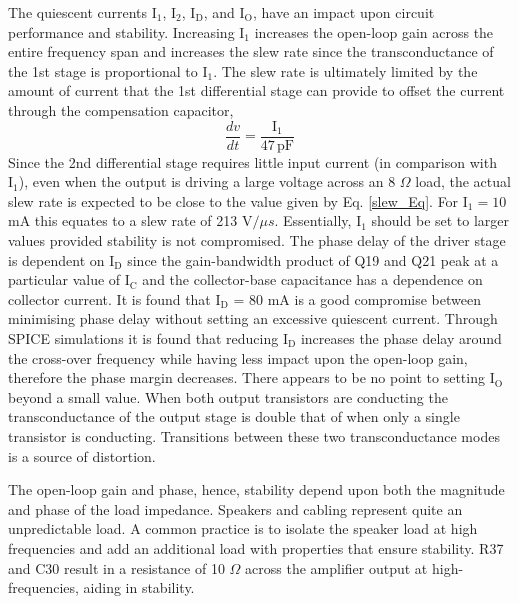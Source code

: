 \documentclass[a4paper,10pt, oneside]{article}
\begin{document}
The quiescent currents $\textrm{I}_{1}$,  $\textrm{I}_{2}$, $\textrm{I}_{\textrm{D}}$, and $\textrm{I}_{\textrm{O}}$, have an impact upon circuit performance and stability. Increasing $\textrm{I}_{1}$ increases the open-loop gain across the entire frequency span and increases the slew rate since the transconductance of the 1st stage is proportional to $\textrm{I}_{1}$. The slew rate is ultimately limited by the amount of current that the 1st differential stage can provide to offset the current through the compensation capacitor,
\begin{equation}\label{slew_Eq}
\frac{dv}{dt} =\frac{\textrm{I}_{1}}{47\,\textrm{pF}}
\end{equation}
Since the 2nd differential stage requires little input current (in comparison with $\textrm{I}_{1}$), even when the output is driving a large voltage across an 8 $\Omega$ load, the actual slew rate is expected to be close to the value given by Eq. \ref{slew_Eq}. For $\textrm{I}_{1}=10$ mA this equates to a slew rate of 213 V$/\mu s$.
Essentially, $\textrm{I}_{1}$ should be set to larger values provided stability is not compromised. The phase delay of the driver stage is dependent on $\textrm{I}_\textrm{{D}}$ since the gain-bandwidth product of Q19 and Q21 peak at a particular value of $\textrm{I}_{\textrm{C}}$
and the collector-base capacitance has a dependence on collector current. It is found that $\textrm{I}_\textrm{{D}}$ = 80 mA is a good compromise between minimising phase delay without setting an excessive quiescent current. Through SPICE simulations it is found that reducing $\textrm{I}_\textrm{{D}}$ increases the phase delay around the cross-over frequency while having less impact upon the open-loop gain, therefore the phase margin decreases. 
There appears to be no point to setting $\textrm{I}_{\textrm{O}}$ beyond a small value. When both output transistors are conducting the transconductance of the output stage is double that of when only a single transistor is conducting. Transitions between these two transconductance modes is a source of distortion. 

The open-loop gain and phase, hence, stability depend upon both the magnitude and phase of the load impedance. Speakers and cabling represent quite an unpredictable load. A common practice is to isolate the speaker load at high frequencies and add an additional load with properties that ensure stability. R37 and C30 result in a resistance of 10 $\Omega$ across the amplifier output at high-frequencies, aiding in stability. 
\end{document}
